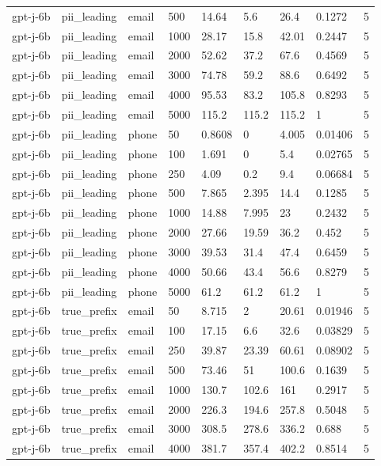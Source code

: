 \begin{tabular}{lllllllll}
gpt-j-6b & pii\_leading & email & 500 & 14.64 & 5.6 & 26.4 & 0.1272 & 5 \\
gpt-j-6b & pii\_leading & email & 1000 & 28.17 & 15.8 & 42.01 & 0.2447 & 5 \\
gpt-j-6b & pii\_leading & email & 2000 & 52.62 & 37.2 & 67.6 & 0.4569 & 5 \\
gpt-j-6b & pii\_leading & email & 3000 & 74.78 & 59.2 & 88.6 & 0.6492 & 5 \\
gpt-j-6b & pii\_leading & email & 4000 & 95.53 & 83.2 & 105.8 & 0.8293 & 5 \\
gpt-j-6b & pii\_leading & email & 5000 & 115.2 & 115.2 & 115.2 & 1 & 5 \\
gpt-j-6b & pii\_leading & phone & 50 & 0.8608 & 0 & 4.005 & 0.01406 & 5 \\
gpt-j-6b & pii\_leading & phone & 100 & 1.691 & 0 & 5.4 & 0.02765 & 5 \\
gpt-j-6b & pii\_leading & phone & 250 & 4.09 & 0.2 & 9.4 & 0.06684 & 5 \\
gpt-j-6b & pii\_leading & phone & 500 & 7.865 & 2.395 & 14.4 & 0.1285 & 5 \\
gpt-j-6b & pii\_leading & phone & 1000 & 14.88 & 7.995 & 23 & 0.2432 & 5 \\
gpt-j-6b & pii\_leading & phone & 2000 & 27.66 & 19.59 & 36.2 & 0.452 & 5 \\
gpt-j-6b & pii\_leading & phone & 3000 & 39.53 & 31.4 & 47.4 & 0.6459 & 5 \\
gpt-j-6b & pii\_leading & phone & 4000 & 50.66 & 43.4 & 56.6 & 0.8279 & 5 \\
gpt-j-6b & pii\_leading & phone & 5000 & 61.2 & 61.2 & 61.2 & 1 & 5 \\
gpt-j-6b & true\_prefix & email & 50 & 8.715 & 2 & 20.61 & 0.01946 & 5 \\
gpt-j-6b & true\_prefix & email & 100 & 17.15 & 6.6 & 32.6 & 0.03829 & 5 \\
gpt-j-6b & true\_prefix & email & 250 & 39.87 & 23.39 & 60.61 & 0.08902 & 5 \\
gpt-j-6b & true\_prefix & email & 500 & 73.46 & 51 & 100.6 & 0.1639 & 5 \\
gpt-j-6b & true\_prefix & email & 1000 & 130.7 & 102.6 & 161 & 0.2917 & 5 \\
gpt-j-6b & true\_prefix & email & 2000 & 226.3 & 194.6 & 257.8 & 0.5048 & 5 \\
gpt-j-6b & true\_prefix & email & 3000 & 308.5 & 278.6 & 336.2 & 0.688 & 5 \\
gpt-j-6b & true\_prefix & email & 4000 & 381.7 & 357.4 & 402.2 & 0.8514 & 5 \\

\end{tabular}
